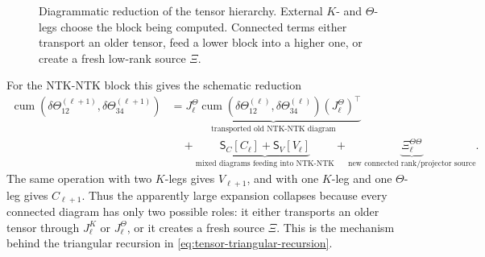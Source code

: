 \documentclass{article}
\newcommand{\cumul}{\operatorname{cum}}
\begin{document}
\begin{figure}[H]
{
}
\caption{Diagrammatic reduction of the tensor hierarchy. External \(K\)- and \(\Theta\)-legs choose the block being computed. Connected terms either transport an older tensor, feed a lower block into a higher one, or create a fresh low-rank source \(\Xi\).}
\label{fig:appendix-diagram-reduction}
\end{figure}

For the NTK-NTK block this gives the schematic reduction
\begin{equation}
\begin{aligned}
\cumul(\delta\Theta^{(\ell+1)}_{12},\delta\Theta^{(\ell+1)}_{34})
&=
\underbrace{J^\Theta_\ell
\cumul(\delta\Theta^{(\ell)}_{12},\delta\Theta^{(\ell)}_{34})
(J^\Theta_\ell)^\top}_{\text{transported old NTK-NTK diagram}}\\
&\quad+
\underbrace{\mathsf S_C[C_\ell]+\mathsf S_V[V_\ell]}_{\text{mixed diagrams feeding into NTK-NTK}}+
\underbrace{\Xi^{\Theta\Theta}_\ell}_{\text{new connected rank/projector source}}.
\end{aligned}
\label{eq:appendix-diagram-reduction-A}
\end{equation}
The same operation with two \(K\)-legs gives \(V_{\ell+1}\), and with one \(K\)-leg and one \(\Theta\)-leg gives \(C_{\ell+1}\). Thus the apparently large expansion collapses because every connected diagram has only two possible roles: it either transports an older tensor through \(J^K_\ell\) or \(J^\Theta_\ell\), or it creates a fresh source \(\Xi\). This is the mechanism behind the triangular recursion in \eqref{eq:tensor-triangular-recursion}.
\end{document}
